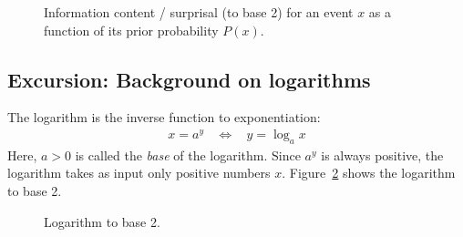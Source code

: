 \documentclass[nobib,nofonts]{tufte-handout}
\begin{document}
\begin{figure}
  \centering


{}

\caption{Information content / surprisal (to base 2) for an event $x$ as a function of its prior probability $P(x)$.}
\label{fig:log-surprisal}
\end{figure}

\subsection{Excursion: Background on logarithms}

The logarithm is the inverse function to exponentiation:
\begin{align*}
   x = a^{y} \ \ \ \  \Leftrightarrow  \ \ \ \  y = \log_{a} x
\end{align*}
Here, $a > 0$ is called the \emph{base} of the logarithm.
Since $a^{y}$ is always positive, the logarithm takes as input only positive numbers $x$.
Figure~\ref{fig:logarithm} shows the logarithm to base 2.

\begin{figure}
  \centering

\caption{Logarithm to base 2.}
\label{fig:logarithm}
\end{figure}
\end{document}
